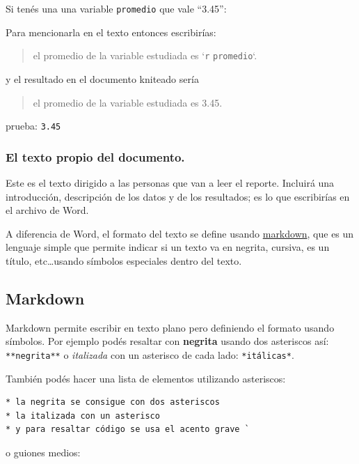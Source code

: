 \documentclass[
  letterpaper,
  DIV=11,
  numbers=noendperiod]{scrartcl}
\begin{document}
Si tenés una una variable \texttt{promedio} que vale ``3.45'':

Para mencionarla en el texto entonces escribirías:

\begin{quote}
el promedio de la variable estudiada es `\texttt{r} \texttt{promedio}`.
\end{quote}

y el resultado en el documento kniteado sería

\begin{quote}
el promedio de la variable estudiada es 3.45.
\end{quote}

prueba: \texttt{3.45}

\hypertarget{el-texto-propio-del-documento.}{%
\subsubsection{El texto propio del
documento.}\label{el-texto-propio-del-documento.}}

Este es el texto dirigido a las personas que van a leer el reporte.
Incluirá una introducción, descripción de los datos y de los resultados;
es lo que escribirías en el archivo de Word.

A diferencia de Word, el formato del texto se define usando
\href{https://es.wikipedia.org/wiki/Markdown}{markdown}, que es un
lenguaje simple que permite indicar si un texto va en negrita, cursiva,
es un título, etc\ldots usando símbolos especiales dentro del texto.

\hypertarget{markdown}{%
\subsection{Markdown}\label{markdown}}

Markdown permite escribir en texto plano pero definiendo el formato
usando símbolos. Por ejemplo podés resaltar con \textbf{negrita} usando
dos asteriscos así: \texttt{**negrita**} o \emph{italizada} con un
asterisco de cada lado: \texttt{*itálicas*}.

También podés hacer una lista de elementos utilizando asteriscos:

\begin{verbatim}
* la negrita se consigue con dos asteriscos
* la italizada con un asterisco
* y para resaltar código se usa el acento grave `
\end{verbatim}

o guiones medios:
\end{document}
